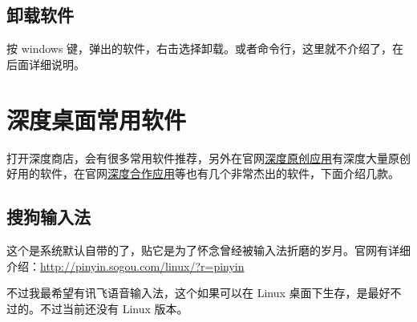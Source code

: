 \documentclass[doctor,openright,twoside]{sjtuthesis}
\theoremstyle{plain}
\theoremstyle{definition}
\theoremstyle{remark}
\theoremstyle{ocrenumbox}
\theoremstyle{plain}
\begin{document}

\subsection{卸载软件}

按 windows
键，弹出的软件，右击选择卸载。或者命令行，这里就不介绍了，在后面详细说明。

\section{深度桌面常用软件}

打开深度商店，会有很多常用软件推荐，另外在官网\href{https://www.deepin.org/original/}{深度原创应用}有深度大量原创好用的软件，在官网\href{https://www.deepin.org/cooperative/}{深度合作应用}等也有几个非常杰出的软件，下面介绍几款。

\subsection{搜狗输入法}

这个是系统默认自带的了，贴它是为了怀念曾经被输入法折磨的岁月。官网有详细介绍：\url{http://pinyin.sogou.com/linux/?r=pinyin}

不过我最希望有讯飞语音输入法，这个如果可以在 Linux
桌面下生存，是最好不过的。不过当前还没有 Linux 版本。
\end{document}
